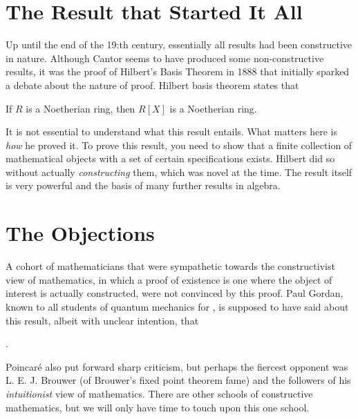 \section{The Result that Started It All}
Up until the end of the 19:th century, essentially all results had been constructive in nature. Although Cantor seems to have produced some non-constructive results, it was the proof of Hilbert's Basis Theorem in 1888 that initially sparked a debate about the nature of proof. Hilbert basis theorem states that 
\begin{theorem}
If $R$ is a Noetherian ring, then $R[X]$ is a Noetherian ring.
\end{theorem}
It is not essential to understand what this result entails. What matters here is \emph{how} he proved it. To prove this result, you need to show that a finite collection of mathematical objects with a set of certain specifications exists. Hilbert did so without actually \emph{constructing} them, which was novel at the time. The result itself is very powerful and the basis of many further results in algebra.

\section{The Objections}
A cohort of mathematicians that were sympathetic towards the constructivist view of mathematics, in which a proof of existence is one where the object of interest is actually constructed, were not convinced by this proof. Paul Gordan, known to all students of quantum mechanics for , is supposed to have said about this result, albeit with unclear intention, that 

.

Poincaré also put forward sharp criticism, but perhaps the fiercest opponent was L. E. J. Brouwer (of Brouwer's fixed point theorem fame) and the followers of his \emph{intuitionist} view of mathematics. There are other schools of constructive mathematics, but we will only have time to touch upon this one school.


